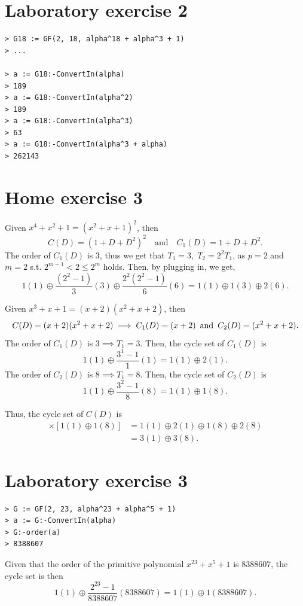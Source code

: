 \documentclass{article}
\theoremstyle{definition}
\theoremstyle{definition}
\theoremstyle{definition}
\begin{document}
\section{Laboratory exercise 2}
\begin{verbatim}
> G18 := GF(2, 18, alpha^18 + alpha^3 + 1)
> ...

> a := G18:-ConvertIn(alpha)
> 189
> a := G18:-ConvertIn(alpha^2)
> 189
> a := G18:-ConvertIn(alpha^3)
> 63
> a := G18:-ConvertIn(alpha^3 + alpha)
> 262143
\end{verbatim}

\section{Home exercise 3}
Given $x^4 + x^2 + 1 = (x^2 + x +1)^2$, then
$$C(D) = (1 + D + D^2)^2 \quad \text{and} \quad C_1(D) = 1 + D + D^2.$$
The order of $C_1(D)$ is $3$, thus we get that $T_1 = 3,\;T_2 = 2^2T_1$, as $p = 2$ and $m = 2$ s.t. $2^{m - 1} < 2 \leq 2^m$ holds.
Then, by plugging in, we get,
$$1(1) \oplus \frac{(2^2 - 1)}{3}(3) \oplus \frac{2^2(2^2 - 1)}{6}(6) = 1(1) \oplus 1(3) \oplus 2(6).$$

Given $x^3 + x + 1 = (x + 2)(x^2 + x + 2)$, then
$$C(D) = (x + 2)(x^2 + x + 2) \implies C_1(D) = (x + 2) \enskip \text{and} \enskip C_2(D) = (x^2 + x + 2).$$
The order of $C_1(D)$ is $3 \implies T_1 = 3$. Then, the cycle set of $C_1(D)$ is
$$1(1) \oplus \frac{3^1 - 1}{1}(1) = 1(1) \oplus 2(1).$$
The order of $C_2(D)$ is $8 \implies T_1 = 8$. Then, the cycle set of $C_2(D)$ is
$$1(1) \oplus \frac{3^2 - 1}{8}(8) = 1(1) \oplus 1(8).$$

Thus, the cycle set of $C(D)$ is
\begin{align*}
[1(1) \oplus 2(1)] \times [1(1) \oplus 1(8)] &= 1(1) \oplus 2(1) \oplus 1(8) \oplus 2(8) \\
&= 3(1) \oplus 3(8).
\end{align*}

\section{Laboratory exercise 3}
\begin{verbatim}
> G := GF(2, 23, alpha^23 + alpha^5 + 1)
> a := G:-ConvertIn(alpha)
> G:-order(a)
> 8388607
\end{verbatim}
Given that the order of the primitive polynomial $x^23 + x^5 + 1$ is $8388607$, the cycle set is then
$$1(1) \oplus \frac{2^{23} - 1}{8388607}(8388607) = 1(1) \oplus 1(8388607).$$
\end{document}
